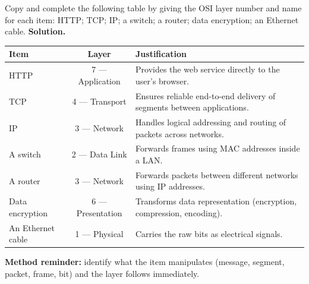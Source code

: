 \documentclass[11pt]{article}
\begin{document}
\begin{exoresolu}
Copy and complete the following table by giving the OSI layer number and name for each item: HTTP; TCP; IP; a switch; a router; data encryption; an Ethernet cable.
\tcblower
\textbf{Solution.}
\begin{center}
\begin{tabularx}{\linewidth}{|l|c|X|}
\hline
\rowcolor{popblueL} \textbf{Item} & \textbf{Layer} & \textbf{Justification} \\
\hline
HTTP & 7 — Application & Provides the web service directly to the user's browser. \\
\hline
TCP & 4 — Transport & Ensures reliable end-to-end delivery of segments between applications. \\
\hline
IP & 3 — Network & Handles logical addressing and routing of packets across networks. \\
\hline
A switch & 2 — Data Link & Forwards frames using MAC addresses inside a LAN. \\
\hline
A router & 3 — Network & Forwards packets between different networks using IP addresses. \\
\hline
Data encryption & 6 — Presentation & Transforms data representation (encryption, compression, encoding). \\
\hline
An Ethernet cable & 1 — Physical & Carries the raw bits as electrical signals. \\
\hline
\end{tabularx}
\end{center}
\textbf{Method reminder:} identify what the item manipulates (message, segment, packet, frame, bit) and the layer follows immediately.
\end{exoresolu}
\end{document}
